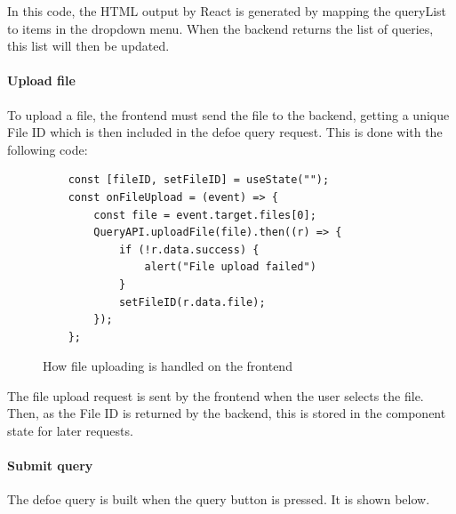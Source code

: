 \documentclass[12pt, letterpaper]{article}
\begin{document}
\begin{flushleft}
In this code, the HTML output by React is generated by mapping the queryList to items in the dropdown menu. When the backend returns the list of queries, this list will then be updated.
\end{flushleft}

\paragraph{Upload file}

\begin{flushleft}
To upload a file, the frontend must send the file to the backend, getting a unique File ID which is then included in the defoe query request. This is done with the following code:
\end{flushleft}

\begin{flushleft}
\begin{figure}[H]
\begin{verbatim}
    const [fileID, setFileID] = useState("");
    const onFileUpload = (event) => {
        const file = event.target.files[0];
        QueryAPI.uploadFile(file).then((r) => {
            if (!r.data.success) {
                alert("File upload failed")
            }
            setFileID(r.data.file);
        });
    };
\end{verbatim}
\caption{How file uploading is handled on the frontend}
\end{figure}
\end{flushleft}

\begin{flushleft}
The file upload request is sent by the frontend when the user selects the file. Then, as the File ID is returned by the backend, this is stored in the component state for later requests.
\end{flushleft}

\paragraph{Submit query}

\begin{flushleft}
The defoe query is built when the query button is pressed. It is shown below.
\end{flushleft}
\end{document}
